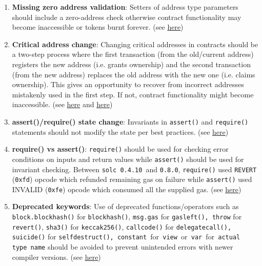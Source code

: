 \begin{enumerate}
\item\textbf{Missing zero address validation}: Setters of address type parameters should include a zero-address check otherwise contract functionality may become inaccessible or tokens burnt forever. (see \href{https://github.com/crytic/slither/wiki/Detector-Documentation\#missing-zero-address-validation}{here})

\item\textbf{Critical address change}: Changing critical addresses in contracts should be a two-step process where the first transaction (from the old/current address) registers the new address (i.e. grants ownership) and the second transaction (from the new address) replaces the old address with the new one (i.e. claims ownership). This gives an opportunity to recover from incorrect addresses mistakenly used in the first step. If not, contract functionality might become inaccessible. (see \href{https://github.com/OpenZeppelin/openzeppelin-contracts/issues/1488}{here} and \href{https://github.com/OpenZeppelin/openzeppelin-contracts/issues/2369}{here})

\item\textbf{assert()/require() state change}: Invariants in \verb|assert()| and \verb|require()| statements should not modify the state per best practices. (see \href{https://swcregistry.io/docs/SWC-110}{here})

\item\textbf{require() vs assert()}: \verb|require()| should be used for checking error conditions on inputs and return values while \verb|assert()| should be used for invariant checking. Between \verb|solc 0.4.10 |and \verb|0.8.0|, \verb|require()| used \verb|REVERT| (\verb|0xfd|) opcode which refunded remaining gas on failure while \verb|assert()| used INVALID (\verb|0xfe|) opcode which consumed all the supplied gas. (see \href{https://docs.soliditylang.org/en/v0.8.1/control-structures.html\#error-handling-assert-require-revert-and-exceptions}{here})

\item\textbf{Deprecated keywords}: Use of deprecated functions/operators such as \verb|block.blockhash()| for \verb|blockhash()|, \verb|msg.gas| for \verb|gasleft(), throw| for \verb|revert()|, \verb|sha3()| for \verb|keccak256()|, \verb|callcode()| for \verb|delegatecall(),| \verb|suicide()| for \verb|selfdestruct(), constant |for\verb| view |or\verb| var |for\linebreak\verb| actual type name| should be avoided to prevent unintended errors with newer compiler versions. (see \href{https://swcregistry.io/docs/SWC-111}{here})


\end{enumerate}

